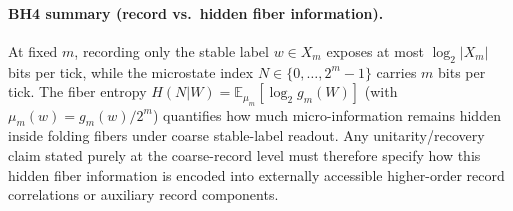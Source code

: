 \paragraph{BH4 summary (record vs.\ hidden fiber information).} \AuditTag At fixed $m$, recording only the stable label $w\in X_m$ exposes at most $\log_2|X_m|$ bits per tick, while the microstate index $N\in\{0,\dots,2^m-1\}$ carries $m$ bits per tick. The fiber entropy $H(N|W)=\mathbb{E}_{\mu_m}[\log_2 g_m(W)]$ (with $\mu_m(w)=g_m(w)/2^m$) quantifies how much micro-information remains hidden inside folding fibers under coarse stable-label readout. Any unitarity/recovery claim stated purely at the coarse-record level must therefore specify how this hidden fiber information is encoded into externally accessible higher-order record correlations or auxiliary record components.
